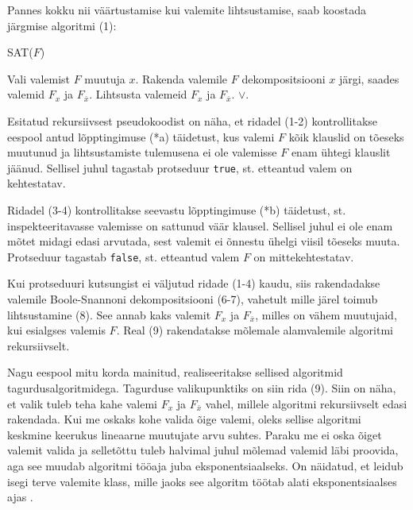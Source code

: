 Pannes kokku nii väärtustamise kui valemite lihtsustamise, saab koostada
järgmise algoritmi (1):

\newpage

\begin{algorithm}{SAT($F$)}
\abody

\begin{algorithmic}[1]
	\RETURN \TRUE
{}
	\RETURN \FALSE
\ELSE
	\STATE Vali valemist $F$ muutuja $x$.
	\STATE Rakenda valemile $F$ dekompositsiooni $x$ järgi, saades valemid $F_x$
	ja $F_{\bar{x}}$.
	\STATE Lihtsusta valemeid $F_x$ ja $F_{\bar{x}}$.
	\RETURN {}$\vee$.
\ENDIF
\end{algorithmic}
\end{algorithm}

Esitatud rekursiivsest pseudokoodist on näha, et ridadel (1-2) kontrollitakse
eespool antud lõpptingimuse (*a) täidetust, kus valemi $F$ kõik klauslid on
tõeseks muutunud ja lihtsustamiste tulemusena ei ole valemisse $F$ enam
ühtegi klauslit jäänud. Sellisel juhul tagastab protseduur \texttt{true},
st. etteantud valem on kehtestatav.

Ridadel (3-4) kontrollitakse seevastu lõpptingimuse (*b) täidetust, st.
inspekteeritavasse valemisse on sattunud väär klausel. Sellisel juhul ei ole
enam mõtet midagi edasi arvutada, sest valemit ei õnnestu ühelgi viisil
tõeseks muuta. Protseduur tagastab \texttt{false}, st. etteantud valem $F$ on
mittekehtestatav.

Kui protseduuri kutsungist ei väljutud ridade (1-4) kaudu, siis rakendadakse
valemile Boole-Snannoni dekompositsiooni (6-7), vahetult mille järel toimub
lihtsustamine (8). See annab kaks valemit $F_x$ ja $F_{\bar{x}}$, milles on
vähem muutujaid, kui esialgses valemis $F$. Real (9) rakendatakse mõlemale
alamvalemile algoritmi  rekursiivselt.

Nagu eespool mitu korda mainitud, realiseeritakse sellised algoritmid
tagurdusalgoritmidega. Tagurduse valikupunktiks on siin rida (9). Siin on näha,
et valik tuleb teha kahe valemi $F_x$ ja $F_{\bar{x}}$ vahel, millele algoritmi
rekursiivselt edasi rakendada. Kui me oskaks kohe valida õige valemi, oleks
sellise algoritmi keskmine keerukus lineaarne muutujate arvu suhtes.
Paraku me ei oska õiget valemit valida ja selletõttu tuleb halvimal juhul mõlemad valemid läbi
proovida, aga see muudab algoritmi tööaja juba eksponentsiaalseks. On näidatud,
et leidub isegi terve valemite klass, mille jaoks see algoritm töötab alati
eksponentsiaalses ajas \cite{tombak07}.

